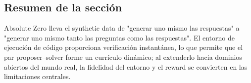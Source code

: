 \subsection{Resumen de la sección}

Absolute Zero lleva el synthetic data de "generar uno mismo las respuestas" a "generar uno mismo tanto las preguntas como las respuestas". El entorno de ejecución de código proporciona verificación instantánea, lo que permite que el par proposer--solver forme un currículo dinámico; al extenderlo hacia dominios abiertos del mundo real, la fidelidad del entorno y el reward se convierten en las limitaciones centrales.
